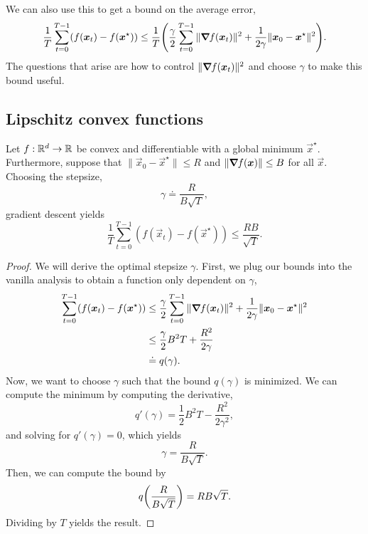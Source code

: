 We can also use this to get a bound on the average error, \[
    \frac{1}{T} \sum_{t=0}^{T-1} (f(\vec{x}_t) - f(\vec{x}^\star)) \leq \frac{1}{T} \lft( \frac{\gamma}{2} \sum_{t=0}^{T-1} \|\grad{f(\vec{x}_t)}{}\|^2 + \frac{1}{2\gamma} \|\vec{x}_0-\vec{x}^\star\|^2 \rgt).
\]
The questions that arise are how to control $\| \bm{\nabla}_{\! } f(\bm{x}_t) \|^2$ and choose $\gamma$ to
make this bound useful.

\subsection{Lipschitz convex functions}


\begin{theorem} \label{thm:lipschitz}
    Let $f: \mathbb{R}^d \to \mathbb{R}$ be convex and differentiable with a global minimum $\vec{x}^\star$.
    Furthermore, suppose that $\|\vec{x}_0-\vec{x}^\star\| \leq R$ and $\|\bm{\nabla}_{\! } f(\bm{x})\| \leq B$
    for all $\vec{x}$. Choosing the stepsize, \[
        \gamma \doteq \frac{R}{B \sqrt{T}},
    \]
    gradient descent yields \[
        \frac{1}{T} \sum_{t=0}^{T-1} (f(\vec{x}_t) - f(\vec{x}^\star)) \leq \frac{RB}{\sqrt{T}}.
    \]
\end{theorem}

\begin{proof}
    We will derive the optimal stepsize $\gamma$. First, we plug our bounds into the vanilla analysis
    to obtain a function only dependent on $\gamma$,
    \begin{align*}
        \sum_{t=0}^{T-1} (f(\bm{x}_t) - f(\bm{x}^\star)) & \leq \frac{\gamma}{2} \sum_{t=0}^{T-1} \|\bm{\nabla}_{\! } f(\bm{x}_t)\|^2 + \frac{1}{2\gamma} \|\bm{x}_0-\bm{x}^\star\|^2 \\
                                                           & \leq \frac{\gamma}{2} B^2 T + \frac{R^2}{2\gamma}                                                                    \\
                                                           & \doteq q(\gamma).
    \end{align*}
    Now, we want to choose $\gamma$ such that the bound $q(\gamma)$ is minimized. We can compute the
    minimum by computing the derivative, \[
        q'(\gamma) = \frac{1}{2} B^2 T - \frac{R^2}{2 \gamma^2},
    \]
    and solving for $q'(\gamma) = 0$, which yields \[
        \gamma = \frac{R}{B \sqrt{T}}.
    \]
    Then, we can compute the bound by \[
        q \lft( \frac{R}{B \sqrt{T}} \rgt) = RB \sqrt{T}.
    \]
    Dividing by $T$ yields the result.
\end{proof}

